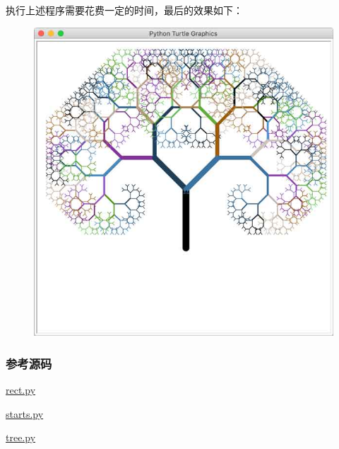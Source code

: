 执行上述程序需要花费一定的时间，最后的效果如下：

 
 \begin{figure}[htp]
	\centering
	\includegraphics[width=0.6\linewidth]{fig/1249600522419392l.png}
\end{figure}


\hypertarget{ux53c2ux8003ux6e90ux7801}{%
\subsubsection{参考源码}\label{ux53c2ux8003ux6e90ux7801}}

\href{https://github.com/michaelliao/learn-python3/blob/master/samples/gui/turtle/rect.py}{rect.py}

\href{https://github.com/michaelliao/learn-python3/blob/master/samples/gui/turtle/starts.py}{starts.py}

\href{https://github.com/michaelliao/learn-python3/blob/master/samples/gui/turtle/tree.py}{tree.py}

